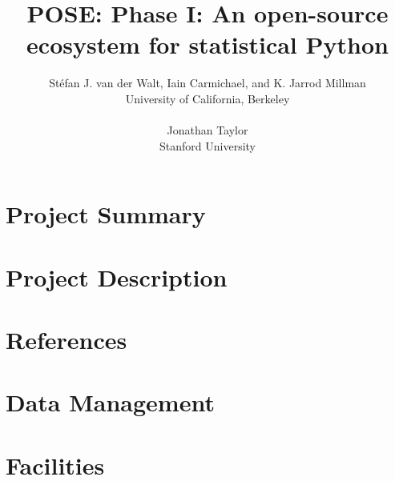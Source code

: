 \documentclass[titlepage,12pt]{amsart}
\title{POSE: Phase I: An open-source ecosystem for statistical Python}
\author{Stéfan J. van der Walt, Iain Carmichael, and K. Jarrod Millman\\ University of California, Berkeley\\
\\
Jonathan Taylor\\ Stanford University}
\theoremstyle{definition}
\numberwithin{equation}{section}
\begin{document}
%
\maketitle
%
\part{Project Summary}


\newpage

\part{Project Description}


\newpage
\part{References}
\printbibliography[heading=none]

\newpage
\part{Data Management}


\newpage
\part{Facilities}

\end{document}
